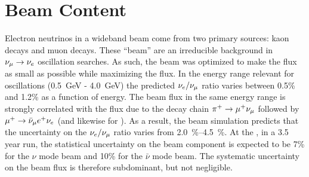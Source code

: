 \section{Beam \nue Content}
\label{ssec:beam-nue}
Electron neutrinos in a wideband beam come from two primary sources: kaon decays and muon decays. These ``beam'' \nue are an irreducible background in $\nu_\mu \to \nu_e$ oscillation searches. As such, the  beam was optimized to make the \nue flux as small as possible while maximizing the \numu flux. In the energy range relevant for oscillations (\SI{0.5}{GeV} - \SI{4.0}{GeV}) the predicted $\nu_e/\nu_\mu$ ratio varies between 0.5\% and 1.2\% as a function of energy. The beam \nue flux in the same energy range is strongly correlated with the \numu flux due to the decay chain $\pi^+\to\mu^+\nu_\mu$ followed by $\mu^+ \to \bar\nu_\mu{} e^+ \nu_e $ (and likewise for \anue). As a result, the   beam simulation predicts that the uncertainty on the $\nu_e/\nu_\mu$ ratio varies from \SIrange{2.0}{4.5}{\%}. At the  , in a 3.5 year run, the statistical uncertainty on the beam \nue component is expected to be 7\% for the $\nu$ mode beam and 10\% for the $\bar{\nu}$ mode beam. The systematic uncertainty on the beam \nue flux is therefore subdominant, but not negligible.  

